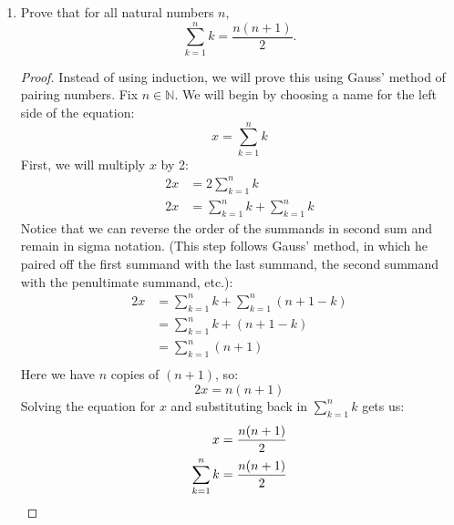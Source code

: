\documentclass[12pt]{amsart}
\begin{document}
\begin{enumerate}
\item Prove that for all natural numbers $n$,
%
\[ \sum_{k=1}^n k = \frac{n(n+1)}{2}. \]
  
\begin{proof}
Instead of using induction, we will prove this using Gauss' method of pairing numbers. Fix $n\in \mathbb N$. We will begin by choosing a name for the left side of the equation:
\[ x = \sum_{k=1}^n k \]
First, we will multiply $x$ by 2:
\begin{align*}
 2x& = 2\sum_{k=1}^n k \\
 2x& = \sum_{k=1}^n k + \sum_{k=1}^n k
\end{align*}
Notice that we can reverse the order of the summands in second sum and remain in sigma notation. (This step follows Gauss' method, in which he paired off the first summand with the last summand, the second summand with the penultimate summand, etc.):
\begin{equation*}
\begin{split}
 2x& = \sum_{k=1}^n k + \sum_{k=1}^n (n+1-k) \\
 & = \sum_{k=1}^n k + (n+1-k) \\
  & = \sum_{k=1}^n (n+1) \\
\end{split}
\end{equation*}
Here we have $n$ copies of $(n+1)$, so:
\[ 2x = n(n+1) \]
Solving the equation for $x$ and substituting back in $\sum_{k=1}^n k$ gets us:
\begin{align*}
x & = {{n(n+1)}\over{2}} \\
{\sum_{k=1}^n k} & = {n(n+1)\over{2}}
\end{align*}
\end{proof}

\end{enumerate}
\end{document}
